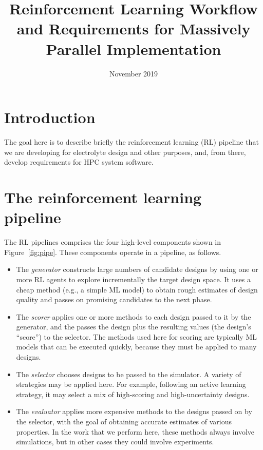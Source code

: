 \documentclass[10pt]{article}
\title{Reinforcement Learning Workflow and Requirements for Massively Parallel Implementation}
\author{}
\date{November 2019}
\begin{document}
\maketitle

\tableofcontents

\section{Introduction}

The goal here is to describe briefly the reinforcement learning (RL) pipeline that we are developing for electrolyte design and other purposes,
and, from there, develop requirements for HPC system software.


\section{The reinforcement learning pipeline}\label{sec:overview} 


The RL pipelines comprises the four high-level components shown in Figure~\ref{fig:pipe}. These components operate in a pipeline, as follows.

\begin{itemize}
\itemsep-0.2em 
\item
The \emph{generator} constructs large numbers of candidate designs by using one or more RL agents to explore incrementally the target design space.
It uses a cheap method (e.g., a simple ML model) to obtain rough estimates of design quality and passes on promising candidates to the next phase.

\item
The \emph{scorer} applies one or more methods to each design passed to it by the generator, 
and the passes the design plus the resulting values (the design's ``score'') to the selector. 
The methods used here for scoring are typically ML models that can be executed quickly, because they must be applied to many designs.

\item
The \emph{selector} chooses designs to be passed to the simulator.
A variety of strategies may be applied here. 
For example, following an active learning strategy, it may select a mix of high-scoring and high-uncertainty designs.

\item
The \emph{evaluator} applies more expensive methods to the designs passed on by the selector, 
with the goal of obtaining accurate estimates of various properties. 
In the work that we perform here, these methods always involve simulations, but in other cases they could involve experiments.

\end{itemize}
\end{document}

